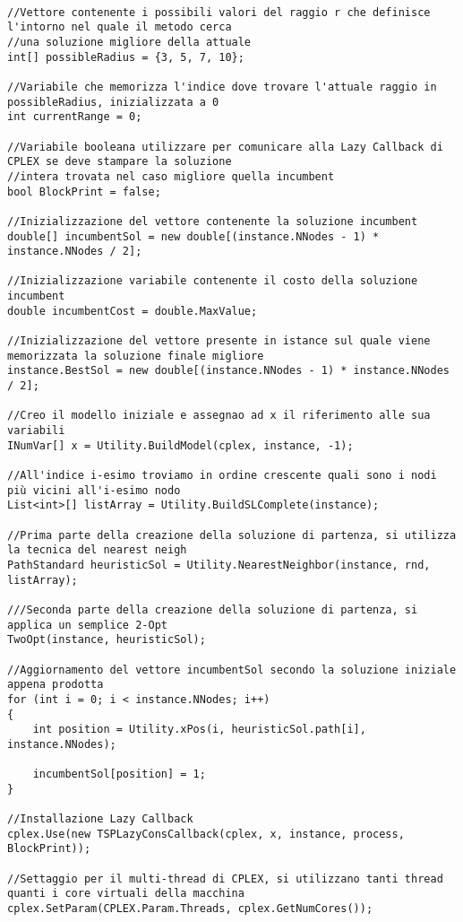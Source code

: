 \documentclass[11pt]{article}
\begin{document}
\begin{lstlisting}

//Vettore contenente i possibili valori del raggio r che definisce l'intorno nel quale il metodo cerca
//una soluzione migliore della attuale
int[] possibleRadius = {3, 5, 7, 10};

//Variabile che memorizza l'indice dove trovare l'attuale raggio in possibleRadius, inizializzata a 0
int currentRange = 0;

//Variabile booleana utilizzare per comunicare alla Lazy Callback di CPLEX se deve stampare la soluzione
//intera trovata nel caso migliore quella incumbent
bool BlockPrint = false;

//Inizializzazione del vettore contenente la soluzione incumbent
double[] incumbentSol = new double[(instance.NNodes - 1) * instance.NNodes / 2];

//Inizializzazione variabile contenente il costo della soluzione incumbent
double incumbentCost = double.MaxValue;

//Inizializzazione del vettore presente in istance sul quale viene memorizzata la soluzione finale migliore
instance.BestSol = new double[(instance.NNodes - 1) * instance.NNodes / 2];

//Creo il modello iniziale e assegnao ad x il riferimento alle sua variabili
INumVar[] x = Utility.BuildModel(cplex, instance, -1);

//All'indice i-esimo troviamo in ordine crescente quali sono i nodi più vicini all'i-esimo nodo
List<int>[] listArray = Utility.BuildSLComplete(instance);

//Prima parte della creazione della soluzione di partenza, si utilizza la tecnica del nearest neigh
PathStandard heuristicSol = Utility.NearestNeighbor(instance, rnd, listArray);

///Seconda parte della creazione della soluzione di partenza, si applica un semplice 2-Opt
TwoOpt(instance, heuristicSol);

//Aggiornamento del vettore incumbentSol secondo la soluzione iniziale appena prodotta
for (int i = 0; i < instance.NNodes; i++)
{
    int position = Utility.xPos(i, heuristicSol.path[i], instance.NNodes);

    incumbentSol[position] = 1;
}

//Installazione Lazy Callback
cplex.Use(new TSPLazyConsCallback(cplex, x, instance, process, BlockPrint));

//Settaggio per il multi-thread di CPLEX, si utilizzano tanti thread quanti i core virtuali della macchina
cplex.SetParam(CPLEX.Param.Threads, cplex.GetNumCores());


\end{lstlisting}
\end{document}
